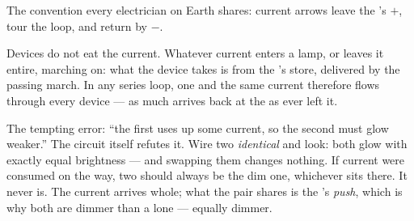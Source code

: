 \begin{omfigure}

{\small The convention every electrician on Earth shares: current
arrows leave the 's $+$, tour the loop, and return by
$-$.}
\end{omfigure}

\begin{proposition}\label{prop:g7:circuits-series-parallel:notconsumed}
Devices do not eat the current. Whatever current enters a lamp,
 or  leaves it entire, marching on: what the device
takes is \emph{} from the 's store, delivered by the
passing march. In any series loop, one and the same current
therefore flows through every device --- as much arrives back at
the  as ever left it.
\end{proposition}

\begin{example}\label{ex:g7:circuits-series-parallel:trial}
The tempting error: ``the first  uses up some current, so the
second must glow weaker.'' The circuit itself refutes it. Wire
two \emph{identical}   and look: both glow with
exactly equal brightness --- and swapping them changes nothing.
If current were consumed on the way,  two should always be
the dim one, whichever  sits there. It never is. The current
arrives whole; what the pair shares is the 's \emph{push},
which is why both are dimmer than a lone  --- equally dimmer.
\end{example}

